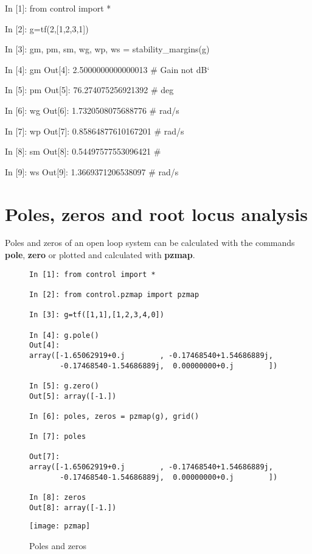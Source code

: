 \begin{code}
In [1]: from control import *

In [2]: g=tf(2,[1,2,3,1])

In [3]: gm, pm, sm, wg, wp, ws = stability_margins(g)

In [4]: gm
Out[4]: 2.5000000000000013	# Gain not dB`

In [5]: pm
Out[5]: 76.274075256921392	# deg

In [6]: wg
Out[6]: 1.7320508075688776	# rad/s

In [7]: wp
Out[7]: 0.85864877610167201	# rad/s

In [8]: sm
Out[8]: 0.54497577553096421	#

In [9]: ws
Out[9]: 1.3669371206538097	# rad/s
\end{code}

\section{Poles, zeros and root locus analysis}
Poles and zeros of an open loop system can be calculated with the 
commands \textbf{pole}, \textbf{zero} or plotted and calculated with 
\textbf{pzmap}.

\begin{figure}[htbp]
\begin{minipage}[t]{0.55\textwidth}
  \vspace{0pt}
\begin{lstlisting}[linewidth=7cm,xleftmargin=0cm]
In [1]: from control import *

In [2]: from control.pzmap import pzmap

In [3]: g=tf([1,1],[1,2,3,4,0])

In [4]: g.pole()
Out[4]: 
array([-1.65062919+0.j        , -0.17468540+1.54686889j,
       -0.17468540-1.54686889j,  0.00000000+0.j        ])

In [5]: g.zero()
Out[5]: array([-1.])

In [6]: poles, zeros = pzmap(g), grid()

In [7]: poles

Out[7]: 
array([-1.65062919+0.j        , -0.17468540+1.54686889j,
       -0.17468540-1.54686889j,  0.00000000+0.j        ])

In [8]: zeros
Out[8]: array([-1.])
\end{lstlisting}

\end{minipage}%
\begin{minipage}[t]{0.5\textwidth}
  \vspace{0pt} \centering
  \texttt{[image: pzmap]}
\end{minipage}
\caption{Poles and zeros}
\label{F8a}
\end{figure}

